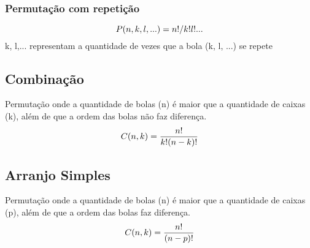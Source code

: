     \subsubsection{Permutação com repetição}
    \begin{equation}
        \centering
        P(n, k, l, ...) = n!/k!l!...
    \end{equation}
    k, l,... representam a quantidade de vezes que a bola (k, l, ...) se repete

\subsection{Combinação}
    Permutação onde a quantidade de bolas (n) é maior que a quantidade de caixas (k), além de que a 
    ordem das bolas não faz diferença.\newline
    \begin{equation}
        \centering
        C(n, k) = \frac{n!}{k!(n-k)!}
    \end{equation}

\subsection{Arranjo Simples}
    Permutação onde a quantidade de bolas (n) é maior que a quantidade de caixas (p), além de que a 
    ordem das bolas faz diferença.\newline
\begin{equation}
    \centering
    C(n, k) = \frac{n!}{(n-p)!}
\end{equation}
        


